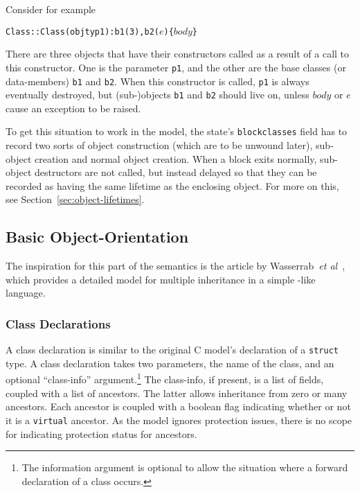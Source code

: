 \documentclass[11pt]{article}
\begin{document}
Consider for example
\begin{alltt}
  Class::Class(objty p1) : b1(3), b2(\(e\)) \{ \(\mathit{body}\) \}
\end{alltt}
There are three objects that have their constructors called as a
result of a call to this constructor.  One is the parameter
\texttt{p1}, and the other are the base classes (or data-members)
\texttt{b1} and \texttt{b2}.  When this constructor is called,
\texttt{p1} is always eventually destroyed, but (sub-)objects
\texttt{b1} and \texttt{b2} should live on, unless $\mathit{body}$ or
$e$ cause an exception to be raised.

To get this situation to work in the model, the state's
\texttt{blockclasses} field has to record two sorts of object
construction (which are to be unwound later), sub-object creation and
normal object creation.  When a block exits normally, sub-object
destructors are not called, but instead delayed so that they can be
recorded as having the same lifetime as the enclosing object.  For
more on this, see Section~\ref{sec:object-lifetimes}.

\subsection{Basic Object-Orientation}
\label{sec:basic-oo}

The inspiration for this part of the semantics is the article by
Wasserrab~\emph{et al}~\cite{wasserrab-nst-OOPSLA06}, which provides a
detailed model for multiple inheritance in a simple \cpp-like
language.

\subsubsection{Class Declarations}
\label{sec:class-declaration}
A class declaration is similar to the original C model's declaration
of a \texttt{struct} type.  A class declaration takes two parameters,
the name of the class, and an optional ``class-info''
argument.\footnote{The information argument is optional to allow the
  situation where a forward declaration of a class occurs.}  The
class-info, if present, is a list of fields, coupled with a list of
ancestors.  The latter allows inheritance from zero or many ancestors.
Each ancestor is coupled with a boolean flag indicating whether or not
it is a \texttt{virtual} ancestor.  As the model ignores protection
issues, there is no scope for indicating protection status for
ancestors.
\end{document}

